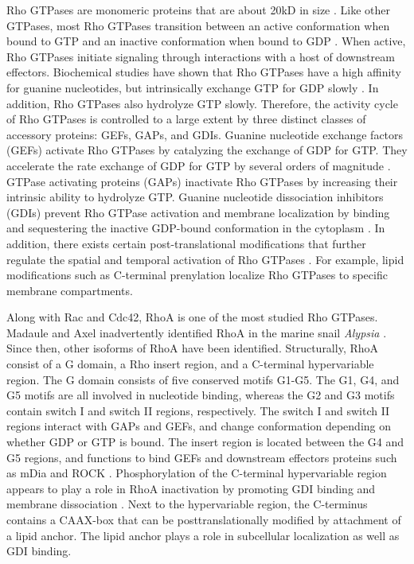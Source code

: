 \documentclass{ucetd}
\begin{document}
Rho GTPases are monomeric proteins that are about 20kD in size \cite{Schaefer:2014ez}.  Like other GTPases, most Rho GTPases transition between an active conformation when bound to GTP and an inactive conformation when bound to GDP \cite{Hodge:2016cz}.  When active, Rho GTPases initiate signaling through interactions with a host of downstream effectors.  Biochemical studies have shown that Rho GTPases have a high affinity for guanine nucleotides, but intrinsically exchange GTP for GDP slowly \cite{Bos:2007cu}.  In addition, Rho GTPases also hydrolyze GTP slowly.  Therefore, the activity cycle of Rho GTPases is controlled to a large extent by three distinct classes of accessory proteins: GEFs, GAPs, and GDIs.  Guanine nucleotide exchange factors (GEFs) activate Rho GTPases by catalyzing the exchange of GDP for GTP.  They accelerate the rate exchange of GDP for GTP by several orders of magnitude \cite{Vetter:2001iw}.  GTPase activating proteins (GAPs) inactivate Rho GTPases by increasing their intrinsic ability to hydrolyze GTP.  Guanine nucleotide dissociation inhibitors (GDIs) prevent Rho GTPase activation and membrane localization by binding and sequestering the inactive GDP-bound conformation in the cytoplasm \cite{GarciaMata:2011hb}.  In addition, there exists certain post-translational modifications that further regulate the spatial and temporal activation of Rho GTPases \cite{Hodge:2016cz}.  For example, lipid modifications such as C-terminal prenylation localize Rho GTPases to specific membrane compartments. 


Along with Rac and Cdc42, RhoA is one of the most studied Rho GTPases.  Madaule and Axel inadvertently identified RhoA in the marine snail \textit{Alypsia} \cite{Madaule:1985wf}.  Since then, other isoforms of RhoA have been identified.  Structurally, RhoA consist of a G domain, a Rho insert region, and a C-terminal hypervariable region.  The G domain consists of five conserved motifs G1-G5.  The G1, G4, and G5 motifs are all involved in nucleotide binding, whereas the G2 and G3 motifs contain switch I and switch II regions, respectively.  The switch I and switch II regions interact with GAPs and GEFs, and change conformation depending on whether GDP or GTP is bound.  The insert region is located between the G4 and G5 regions, and functions to bind GEFs and downstream effectors proteins such as mDia and ROCK \cite{Lammers:2008gi, Zong:2001ho}.  Phosphorylation of the C-terminal hypervariable region appears to play a role in RhoA inactivation by promoting GDI binding and membrane dissociation \cite{Clague:2012gb}.  Next to the hypervariable region, the C-terminus contains a CAAX-box that can be posttranslationally modified by attachment of a lipid anchor.  The lipid anchor plays a role in subcellular localization as well as GDI binding. 
\end{document}
